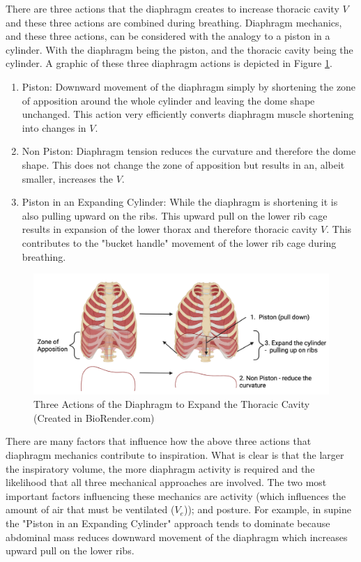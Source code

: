 There are three actions that the diaphragm creates to increase thoracic cavity $V$ and these three actions are combined during breathing. Diaphragm mechanics, and these three actions, can be considered with the analogy to a piston in a cylinder. With the diaphragm being the piston, and the thoracic cavity being the cylinder. A graphic of these three diaphragm actions is depicted in Figure \ref{fig:diaphragm}. 

\begin{enumerate}
    \item Piston: Downward movement of the diaphragm simply by shortening the zone of apposition around the whole cylinder and leaving the dome shape unchanged. This action very efficiently converts diaphragm muscle shortening into changes in $V$.
    \item Non Piston: Diaphragm tension reduces the curvature and therefore the dome shape. This does not change the zone of apposition but results in an, albeit smaller, increases the $V$.
    \item Piston in an Expanding Cylinder: While the diaphragm is shortening it is also pulling upward on the ribs. This upward pull on the lower rib cage results in expansion of the lower thorax and therefore thoracic cavity $V$. This contributes to the "bucket handle" movement of the lower rib cage during breathing.
\end{enumerate}

\begin{figure}[]
    \centering
    \includegraphics[width = 1.0 \linewidth]{./figure/ventilation/diaphragm.png}
    \caption{Three Actions of the Diaphragm to Expand the Thoracic Cavity \footnotesize{(Created in BioRender.com)}}
    \label{fig:diaphragm}
\end{figure}

There are many factors that influence how the above three actions that diaphragm mechanics contribute to inspiration. What is clear is that the larger the inspiratory volume, the more diaphragm activity is required and the likelihood that all three mechanical approaches are involved. The two most important factors influencing these mechanics are activity (which influences the amount of air that must be ventilated ($V_e$)); and posture. For example, in supine the "Piston in an Expanding Cylinder" approach tends to dominate because abdominal mass reduces downward movement of the diaphragm which increases upward pull on the lower ribs.

